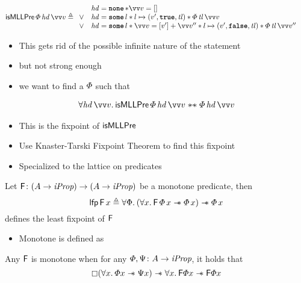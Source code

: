 \documentclass[thesis.tex]{subfiles}
\begin{document}
\begin{align*}
  \textlog{isMLLPre}\, \pred\, \langv{hd}\, \vect{v} & \eqdef
  \begin{array}{rl}
         & \langv{hd} = \None * \vect{v} = []                                                                                                         \\
    \lor & \langv{hd} = \Some l * l \fmapsto (\val', \True, \langv{tl}) * \pred\, \langv{tl}\, \vect{v}                                               \\
    \lor & \langv{hd} = \Some l * \vect{\val} = [\val'] + \vect{\val}'' * l \fmapsto (\val', \False, \langv{tl}) * \pred\, \langv{tl}\, \vect{\val}''
  \end{array}
\end{align*}
\begin{itemize}
  \item This gets rid of the possible infinite nature of the statement
  \item but not strong enough
  \item we want to find a $\varPhi$ such that
\end{itemize}
\begin{align*}
  \All \langv{hd}\, \vect{v}. \textlog{isMLLPre}\, \pred\, \langv{hd}\, \vect{v} \wandIff \pred\, \langv{hd}\, \vect{v}
\end{align*}
\begin{itemize}
  \item This is the fixpoint of $\textsf{\upshape isMLLPre}$
  \item Use Knaster-Tarski Fixpoint Theorem to find this fixpoint \cite*{tarskiLatticetheoreticalFixpointTheorem1955}
  \item Specialized to the lattice on predicates
\end{itemize}
\begin{theorem}
  \label{thm:tarski}
  Let $\textsf{\upshape F}\colon (A \to \textit{iProp}) \to (A \to \textit{iProp})$ be a monotone predicate, then
  \[\lfp\, \hopred\, \var \eqdef \All \Phi. (\All \var. \hopred\, \pred\, \var \wand \pred\, \var) \wand \pred \, \var\]
  defines the least fixpoint of $\textsf{\upshape F}$
\end{theorem}
\begin{itemize}
  \item Monotone is defined as
\end{itemize}
\begin{definition}
  Any $\textsf{\upshape F}$ is monotone when for any $\varPhi, \Psi\colon A \to \textit{iProp}$, it holds that
  \[\always(\All \var. \pred\var \wand \predB\var) \wand \All \var. \hopred\pred\var \wand \hopred\pred\var\]
\end{definition}
\end{document}
